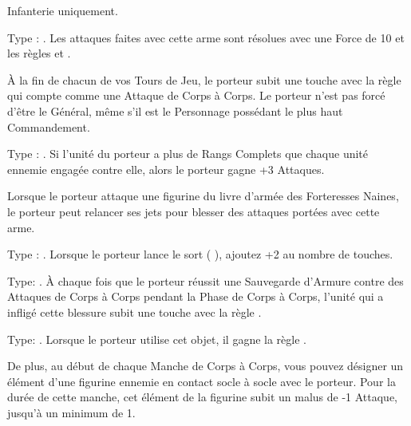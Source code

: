 \closearmyarmoury






\startarmymagicalitems

\armymagicalweapons

\startpricelist

Infanterie uniquement.

Type : \hw{}. Les attaques faites avec cette arme sont résolues avec une Force de 10 et les règles \divineattacks{} et .

À la fin de chacun de vos Tours de Jeu, le porteur subit une touche avec la règle \toxicattacks{} qui compte comme une Attaque de Corps à Corps. Le porteur n'est pas forcé d'être le Général, même s'il est le Personnage possédant le plus haut Commandement.

Type : \hw{}. Si l'unité du porteur a plus de Rangs Complets que chaque unité ennemie engagée contre elle, alors le porteur gagne +3 Attaques.

Lorsque le porteur attaque une figurine du livre d'armée des Forteresses Naines, le porteur peut relancer ses jets pour blesser des attaques portées avec cette arme.

Type : \halberd{}. Lorsque le porteur lance le sort \ruinsignature{} (\Pathof{} \ruin{}), ajoutez +2 au nombre de touches.

\endpricelist

\armymagicalarmour

\startpricelist

Type: \platearmour{}. À chaque fois que le porteur réussit une Sauvegarde d'Armure contre des Attaques de Corps à Corps pendant la Phase de Corps à Corps, l'unité qui a infligé cette blessure subit une touche avec la règle \toxicattacks{}.

Type: \shield{}. Lorsque le porteur utilise cet objet, il gagne la règle \distracting{}.

De plus, au début de chaque Manche de Corps à Corps, vous pouvez désigner un élément d'une figurine ennemie en contact socle à socle avec le porteur. Pour la durée de cette manche, cet élément de la figurine subit un malus de -1 Attaque, jusqu'à un minimum de 1.

\endpricelist

\armytalismans

